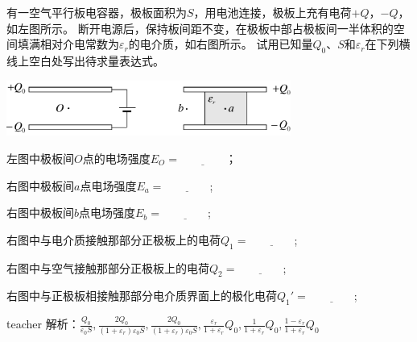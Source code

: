\begin{example}
有一空气平行板电容器，极板面积为$S$，用电池连接，极板上充有电荷$+Q$，$-Q$，如左图所示。
断开电源后，保持板间距不变，在极板中部占极板间一半体积的空间填满相对介电常数为$ \varepsilon_r$的电介质，如右图所示。
试用已知量$Q_0$、$S$和$ \varepsilon_r$在下列横线上空白处写出待求量表达式。
\begin{center}
\includegraphics[width = 0.7\textwidth]{images/elec-problem-22.pdf}

\end{center}


左图中极板间$O$点的电场强度$E_O = \underline{\qquad \qquad }$；

右图中极板间$a$点电场强度$E_a= \underline{\qquad \qquad }$;

右图中极板间$b$点电场强度$E_b= \underline{\qquad \qquad }$;

右图中与电介质接触那部分正极板上的电荷$Q_1= \underline{\qquad \qquad }$;

右图中与空气接触那部分正极板上的电荷$Q_2= \underline{\qquad \qquad }$;

右图中与正极板相接触那部分电介质界面上的极化电荷$Q_1'= \underline{\qquad \qquad }$;




\begin{taggedblock}{teacher}
\noindent
解析：$\frac{Q_0}{\varepsilon_0S},\frac{2Q_0}{(1+\varepsilon_r)\varepsilon_0S},\frac{2Q_0}{(1+\varepsilon_r)\varepsilon_0S},\frac{\varepsilon_r}{1+\varepsilon_r}Q_0,\frac{1}{1+\varepsilon_r}Q_0,\frac{1-\varepsilon_r}{1+\varepsilon_r}Q_0$
\end{taggedblock}
\end{example}